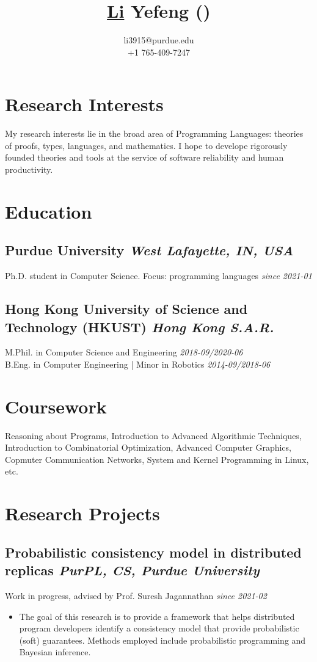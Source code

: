 \documentclass[11pt]{article}
\title{
  \bfseries\underline{Li} Yefeng
  (\raisebox{-1pt}{\Large\zhfont 李烨锋})}
\author{
  \normalsize li3915@purdue.edu \\
  \normalsize +1 765-409-7247}
\newcommand{\subsec}[2]{\subsection*{#1 \hfill {\normalfont\itshape #2}}}
\newcommand{\subsecdesc}[2]{{#1 \hfill \itshape #2}}
\begin{document}
\maketitle

\section*{Research Interests} %

  My research interests lie in the broad area of Programming Languages:
  theories of proofs, types, languages, and mathematics. I hope to develope
  rigorously founded theories and tools at the service of software
  reliability and human productivity.

\section*{Education} %

  \subsec{Purdue University}
         {West Lafayette, IN, USA}
  \subsecdesc{Ph.D. student in Computer Science. Focus: programming languages}
             {since 2021-01}

  \subsec{Hong Kong University of Science and Technology (HKUST)}
         {Hong Kong S.A.R.}
  \subsecdesc{M.Phil. in Computer Science and Engineering}
             {2018-09/2020-06} \\
  \subsecdesc{B.Eng. in Computer Engineering | Minor in Robotics}
             {2014-09/2018-06}

\ifdefined{}
\section*{Coursework} %

  Reasoning about Programs,
  Introduction to Advanced Algorithmic Techniques,
  Introduction to Combinatorial Optimization,
  Advanced Computer Graphics,
  Copmuter Communication Networks,
  System and Kernel Programming in Linux, etc.
\fi

\section*{Research Projects} %

  \subsec{Probabilistic consistency model in distributed replicas}
         {PurPL, CS, Purdue University}
  \subsecdesc{Work in progress, advised by Prof. Suresh Jagannathan}
             {since 2021-02}
  \begin{itemize}
    \item The goal of this research is to provide a framework that helps
      distributed program developers identify a consistency model that
      provide probabilistic (soft) guarantees. Methods employed include
      probabilistic programming and Bayesian inference.
  \end{itemize}
\end{document}
